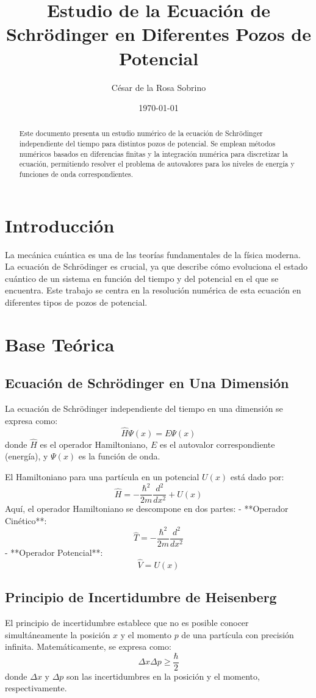 \documentclass[a4paper,12pt]{article}
\title{Estudio de la Ecuación de Schrödinger en Diferentes Pozos de Potencial}
\author{César de la Rosa Sobrino}
\date{\today}
\begin{document}
\maketitle

\begin{abstract}
  Este documento presenta un estudio numérico de la ecuación de Schrödinger independiente del tiempo para distintos pozos de potencial. Se emplean métodos numéricos basados en diferencias finitas y la integración numérica para discretizar la ecuación, permitiendo resolver el problema de autovalores para los niveles de energía y funciones de onda correspondientes.
\end{abstract}

\section{Introducción}
La mecánica cuántica es una de las teorías fundamentales de la física moderna. La ecuación de Schrödinger es crucial, ya que describe cómo evoluciona el estado cuántico de un sistema en función del tiempo y del potencial en el que se encuentra. Este trabajo se centra en la resolución numérica de esta ecuación en diferentes tipos de pozos de potencial.

\section{Base Teórica}
\subsection{Ecuación de Schrödinger en Una Dimensión}
La ecuación de Schrödinger independiente del tiempo en una dimensión se expresa como:
\begin{equation}
    \hat{H} \Psi(x) = E \Psi(x)
\end{equation}
donde \(\hat{H}\) es el operador Hamiltoniano, \(E\) es el autovalor correspondiente (energía), y \(\Psi(x)\) es la función de onda.

El Hamiltoniano para una partícula en un potencial \(U(x)\) está dado por:
\begin{equation}
    \hat{H} = -\frac{\hbar^2}{2m} \frac{d^2}{dx^2} + U(x)
\end{equation}
Aquí, el operador Hamiltoniano se descompone en dos partes:
- **Operador Cinético**: 
  \[
  \hat{T} = -\frac{\hbar^2}{2m} \frac{d^2}{dx^2}
  \]
- **Operador Potencial**: 
  \[
  \hat{V} = U(x)
  \]

\subsection{Principio de Incertidumbre de Heisenberg}
El principio de incertidumbre establece que no es posible conocer simultáneamente la posición \(x\) y el momento \(p\) de una partícula con precisión infinita. Matemáticamente, se expresa como:
\begin{equation}
    \Delta x \Delta p \geq \frac{\hbar}{2}
\end{equation}
donde \(\Delta x\) y \(\Delta p\) son las incertidumbres en la posición y el momento, respectivamente.
\end{document}
